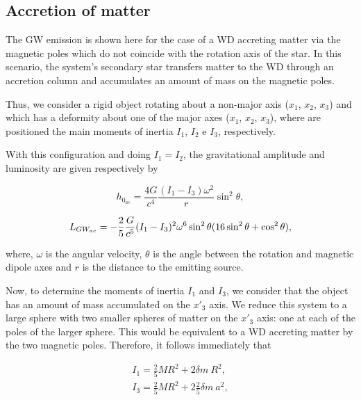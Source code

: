 \documentclass{ws-procs961x669}            %
\begin{document}
\subsection{Accretion of matter}

The GW emission is shown here for the case of a WD accreting matter via the magnetic poles which do not coincide with the rotation axis of the star. In this scenario, the system's secondary star transfers matter to the WD through an accretion column and accumulates an amount of mass on the magnetic poles.

Thus, we consider a rigid object rotating about a non-major axis ($x_{1}$, $x_{2}$, $x_{3}$) and which has a deformity about one of the major axes ($x_{1}$, $x_{2}$, $x_{3}$), where are positioned the main moments of inertia $I_{1}$, $I_{2}$ e $I_{3}$, respectively. 

With this configuration and doing $I_{1} = I_{2}$, the gravitational amplitude and luminosity are given respectively by \cite{shapiro/2008,maggiore/2008}

\begin{equation}
  h_{0_{ac}} = \frac{4G}{c^{4}} \frac{(I_{1}-I_{3}) \omega ^{2}}{r} \sin ^{2}\theta,
  \label{AmpAC2}
\end{equation}


\begin{equation}
  L_{GW_{ac}} = -\frac{2}{5} \frac{G}{c^{5}}(I_{1}-I_{3})^{2} \omega ^{6} \sin^{2}\theta 
  \\ (16 \sin^{2}\theta + \cos^{2}\theta ),
 \label{lumAC1}
\end{equation}

\noindent where, $\omega$ is the angular velocity, $\theta$ is the angle between the rotation and magnetic dipole axes and $r$ is the distance to the emitting source. 

Now, to determine the moments of inertia $I_{1}$ and $I_{3}$, we consider that the object has an amount of mass accumulated on the $x'_{3}$ axis. We reduce this system to a large sphere with two smaller spheres of matter on the $x'_{3}$ axis: one at each of the poles of the larger sphere. This would be equivalent to a WD accreting matter by the two magnetic poles. Therefore, it follows immediately that

\begin{eqnarray}
    I_{1} = \frac{2}{5} MR^{2} + 2\delta m ~R^{2}, \nonumber \\
    I_{3} = \frac{2}{5} MR^{2} + 2 \frac{2}{5} \delta m ~a^{2},
\label{I1AC}
\end{eqnarray}
\end{document}
